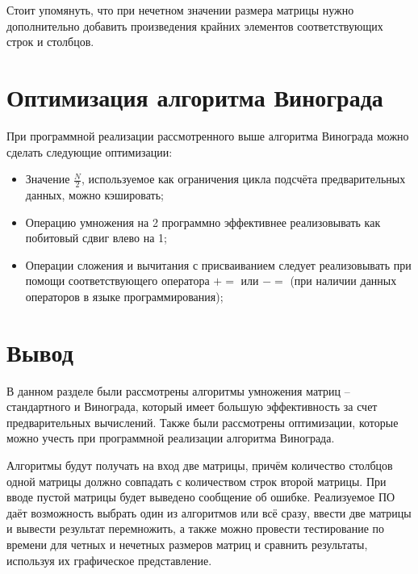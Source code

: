 Стоит упомянуть, что при нечетном значении размера матрицы нужно дополнительно добавить произведения крайних элементов соответствующих строк и столбцов.

\section{Оптимизация алгоритма Винограда}

При программной реализации рассмотренного выше алгоритма Винограда можно сделать следующие оптимизации:
\begin{itemize}[]
	\item Значение $\frac{N}{2}$, используемое как ограничения цикла подсчёта предварительных данных, можно кэшировать;
	\item Операцию умножения на 2 программно эффективнее реализовывать как побитовый сдвиг влево на 1;
	\item Операции сложения и вычитания с присваиванием следует реализовывать при помощи соответствующего оператора $+=$ или $-=$ (при наличии данных операторов в языке программирования);
 \end{itemize}


\section{Вывод}

В данном разделе были рассмотрены алгоритмы умножения матриц -- стандартного и Винограда, который имеет большую эффективность за счет предварительных вычислений. 
Также были рассмотрены оптимизации, которые можно учесть при программной реализации алгоритма Винограда.

Алгоритмы будут получать на вход две матрицы, причём количество столбцов одной матрицы должно совпадать с количеством строк второй матрицы. 
При вводе пустой матрицы будет выведено сообщение об ошибке. Реализуемое ПО даёт возможность выбрать один из алгоритмов или всё сразу, ввести две матрицы и вывести результат перемножить, а также можно провести тестирование по времени для четных и нечетных размеров матриц и сравнить результаты, используя их графическое представление.
